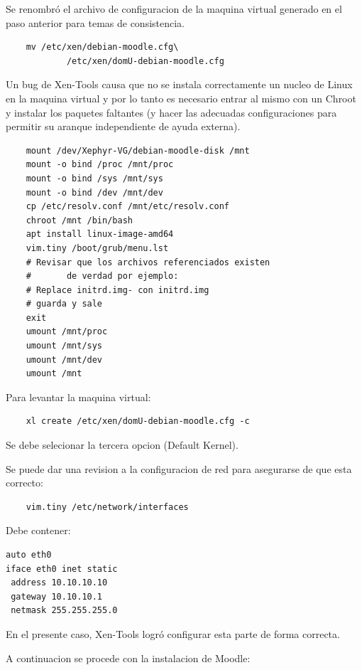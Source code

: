 Se renombró el archivo de configuracion de la maquina virtual generado en el paso anterior para temas de consistencia.

\begin{lstlisting}
	mv /etc/xen/debian-moodle.cfg\
    		/etc/xen/domU-debian-moodle.cfg
\end{lstlisting}

Un bug de Xen-Tools causa que no se instala correctamente un nucleo de Linux en la maquina virtual y por lo tanto es necesario entrar al mismo con un Chroot y instalar los paquetes faltantes (y hacer las adecuadas configuraciones  para permitir su aranque independiente de ayuda externa).

\begin{lstlisting}
	mount /dev/Xephyr-VG/debian-moodle-disk /mnt
	mount -o bind /proc /mnt/proc
	mount -o bind /sys /mnt/sys
	mount -o bind /dev /mnt/dev
	cp /etc/resolv.conf /mnt/etc/resolv.conf
	chroot /mnt /bin/bash
	apt install linux-image-amd64
	vim.tiny /boot/grub/menu.lst
	# Revisar que los archivos referenciados existen
	#		de verdad por ejemplo:
	# Replace initrd.img- con initrd.img
    # guarda y sale
	exit
	umount /mnt/proc            
	umount /mnt/sys 
	umount /mnt/dev 
	umount /mnt	
\end{lstlisting}

Para levantar la maquina virtual:

\begin{lstlisting}
	xl create /etc/xen/domU-debian-moodle.cfg -c
\end{lstlisting}

Se debe selecionar la tercera opcion (Default Kernel).

Se puede dar una revision a la configuracion de red para asegurarse de que esta correcto:

\begin{lstlisting}
	vim.tiny /etc/network/interfaces
\end{lstlisting}

Debe contener:

\begin{lstlisting}
auto eth0
iface eth0 inet static
 address 10.10.10.10
 gateway 10.10.10.1
 netmask 255.255.255.0
\end{lstlisting}

En el presente caso, Xen-Tools logró configurar esta parte de forma correcta.

A continuacion se procede con la instalacion de Moodle:

